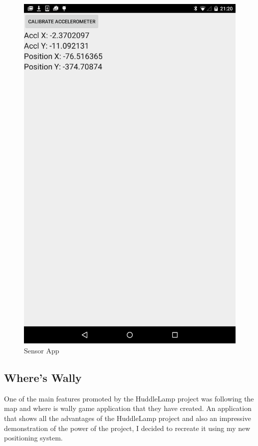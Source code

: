 \begin{figure}[h]
    \includegraphics[scale=0.2]{images/sensor}
    \protect\caption{Sensor App} 
    \label{sensor_app_image}
\end{figure}


\subsection{Where's Wally}
One of the main features promoted by the HuddleLamp project was following the map and where is wally game application that they have created. An application that shows all the advantages of the HuddleLamp project and also an impressive demonstration of the power of the project, I decided to recreate it using my new positioning system. 

